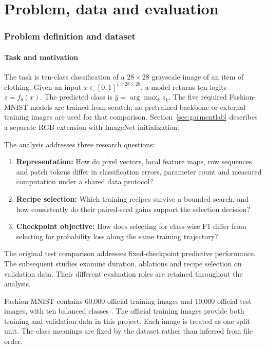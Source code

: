 \part{Problem, data and evaluation}
\section{Problem definition and dataset}
\subsection{Task and motivation}
The task is ten-class classification of a $28\times28$ grayscale image of an item of clothing. Given an input $x\in[0,1]^{1\times28\times28}$, a model returns ten logits $z=f_\theta(x)$. The predicted class is $\hat y=\arg\max_k z_k$. The five required Fashion-MNIST models are trained from scratch; no pretrained backbone or external training images are used for that comparison. Section~\ref{sec:garmentlab} describes a separate RGB extension with ImageNet initialization.

The analysis addresses three research questions:
\begin{enumerate}
\item \textbf{Representation:} How do pixel vectors, local feature maps, row sequences and patch tokens differ in classification errors, parameter count and measured computation under a shared data protocol?
\item \textbf{Recipe selection:} Which training recipes survive a bounded search, and how consistently do their paired-seed gains support the selection decision?
\item \textbf{Checkpoint objective:} How does selecting for class-wise F1 differ from selecting for probability loss along the same training trajectory?
\end{enumerate}
The original test comparison addresses fixed-checkpoint predictive performance. The subsequent studies examine duration, ablations and recipe selection on validation data. Their different evaluation roles are retained throughout the analysis.

Fashion-MNIST contains 60,000 official training images and 10,000 official test images, with ten balanced classes \cite{fashionmnist}. The official training images provide both training and validation data in this project. Each image is treated as one split unit. The class meanings are fixed by the dataset rather than inferred from file order.

